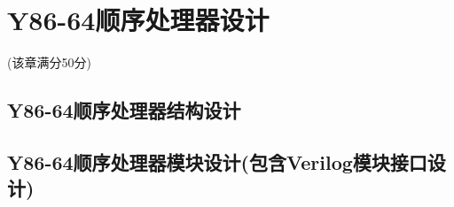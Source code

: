\section{Y86-64顺序处理器设计}
\begin{center}
    (该章满分50分)
\end{center}

\subsection{Y86-64顺序处理器结构设计}

\subsection{Y86-64顺序处理器模块设计(包含Verilog模块接口设计)}